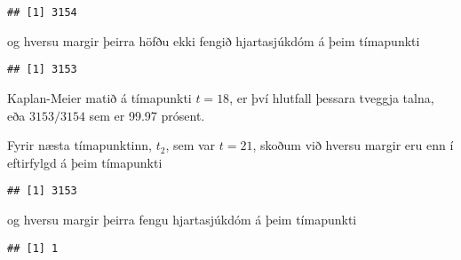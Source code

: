 \documentclass[
]{book}
\newenvironment{Shaded}{\begin{snugshade}}{\end{snugshade}}
\newcommand{\DecValTok}[1]{\textcolor[rgb]{0.00,0.00,0.81}{#1}}
\newcommand{\KeywordTok}[1]{\textcolor[rgb]{0.13,0.29,0.53}{\textbf{#1}}}
\newcommand{\NormalTok}[1]{#1}
\newcommand{\OperatorTok}[1]{\textcolor[rgb]{0.81,0.36,0.00}{\textbf{#1}}}
\newcommand{\StringTok}[1]{\textcolor[rgb]{0.31,0.60,0.02}{#1}}
\begin{document}
\begin{verbatim}
## [1] 3154
\end{verbatim}

og hversu margir þeirra höfðu ekki fengið hjartasjúkdóm á þeim tímapunkti

\begin{Shaded}
\end{Shaded}

\begin{verbatim}
## [1] 3153
\end{verbatim}

Kaplan-Meier matið á tímapunkti \(t=18\), er því hlutfall þessara tveggja talna, eða \(3153/3154\) sem er 99.97 prósent.

Fyrir næsta tímapunktinn, \(t_2\), sem var \(t=21\), skoðum við hversu margir eru enn í eftirfylgd á þeim tímapunkti

\begin{Shaded}
\end{Shaded}

\begin{verbatim}
## [1] 3153
\end{verbatim}

og hversu margir þeirra fengu hjartasjúkdóm á þeim tímapunkti

\begin{Shaded}
\end{Shaded}

\begin{verbatim}
## [1] 1
\end{verbatim}
\end{document}
